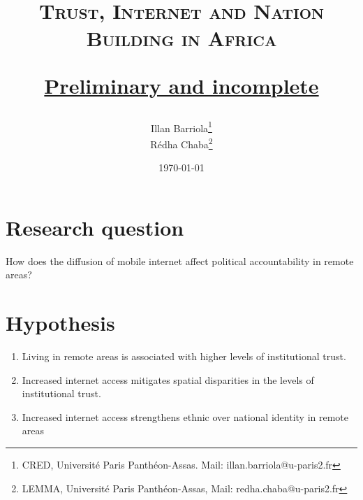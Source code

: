 \documentclass[11pt]{article}
\theoremstyle{plain}
\theoremstyle{plain}
\begin{document}
\title{\textsc{Trust, Internet and Nation Building in Africa}

\vspace{0.75cm} \underline{Preliminary and incomplete }}

\vspace{1cm}
\author{Illan Barriola\footnote{CRED, Université Paris Panthéon-Assas. Mail: illan.barriola@u-paris2.fr}\\ Rédha Chaba\footnote{LEMMA, Université Paris Panthéon-Assas, Mail: redha.chaba@u-paris2.fr}}


\date{ \today}

\maketitle

\onehalfspacing

\section*{Research question}

How does the diffusion of mobile internet affect political accountability in remote areas?
\section*{Hypothesis}
\begin{enumerate}
  \item Living in remote areas is associated with higher levels of institutional trust.
  \item Increased internet access mitigates spatial disparities in the levels of institutional trust.
  \item Increased internet access strengthens ethnic over national identity in remote areas
\end{enumerate}
\end{document}
